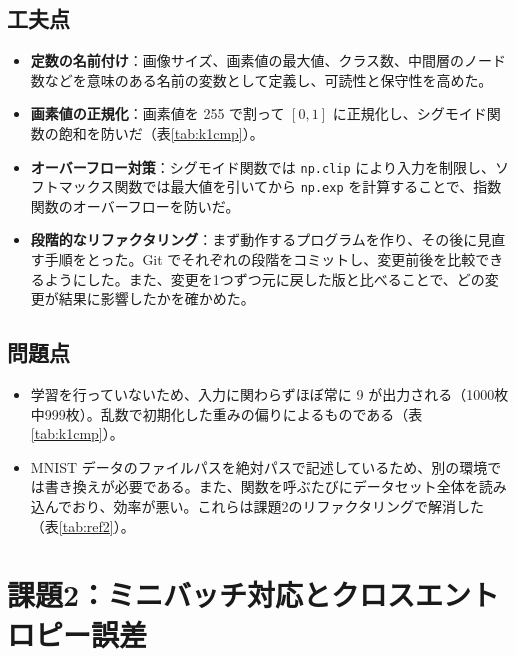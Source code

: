 \documentclass[a4paper,11pt]{ltjsarticle}
\begin{document}
\subsection{工夫点}
\begin{itemize}
  \item \textbf{定数の名前付け}：画像サイズ、画素値の最大値、クラス数、中間層のノード数などを意味のある名前の変数として定義し、可読性と保守性を高めた。
  \item \textbf{画素値の正規化}：画素値を 255 で割って $[0, 1]$ に正規化し、シグモイド関数の飽和を防いだ（表\ref{tab:k1cmp}）。
  \item \textbf{オーバーフロー対策}：シグモイド関数では \texttt{np.clip} により入力を制限し、ソフトマックス関数では最大値を引いてから \texttt{np.exp} を計算することで、指数関数のオーバーフローを防いだ。
  \item \textbf{段階的なリファクタリング}：まず動作するプログラムを作り、その後に見直す手順をとった。Git でそれぞれの段階をコミットし、変更前後を比較できるようにした。また、変更を1つずつ元に戻した版と比べることで、どの変更が結果に影響したかを確かめた。
\end{itemize}

\subsection{問題点}
\begin{itemize}
  \item 学習を行っていないため、入力に関わらずほぼ常に 9 が出力される（1000枚中999枚）。乱数で初期化した重みの偏りによるものである（表\ref{tab:k1cmp}）。
  \item MNIST データのファイルパスを絶対パスで記述しているため、別の環境では書き換えが必要である。また、関数を呼ぶたびにデータセット全体を読み込んでおり、効率が悪い。これらは課題2のリファクタリングで解消した（表\ref{tab:ref2}）。
\end{itemize}


\section{課題2：ミニバッチ対応とクロスエントロピー誤差}
\end{document}
